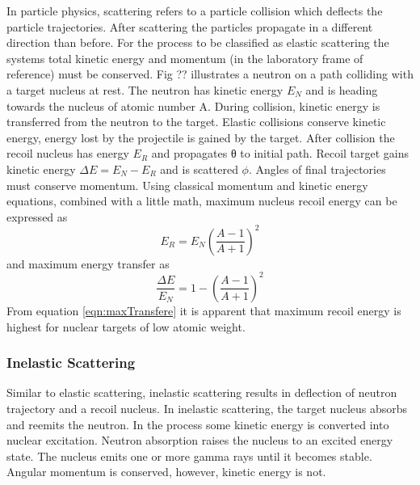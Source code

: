 In particle physics, scattering refers to a particle collision which deflects the particle trajectories. After scattering the particles propagate in a different direction than before. For the process to be classified as elastic scattering the systems total kinetic energy and momentum (in the laboratory frame of reference) must be conserved.
Fig ?? illustrates a neutron on a path colliding with a target nucleus at rest. The neutron has kinetic energy $E_N$  and is heading towards the nucleus of atomic number A. During collision, kinetic energy is transferred from the neutron to the target. Elastic collisions conserve kinetic energy, energy lost by the projectile is gained by the target. After collision the recoil nucleus has energy $E_R$ and propagates θ to initial path. Recoil target gains kinetic energy $\Delta E = E_N-E_R$ and is scattered $\phi$. Angles of final trajectories must conserve momentum.
Using classical momentum and kinetic energy equations, combined with a little math, maximum nucleus recoil energy can be expressed as
      \begin{equation}
      \label{eqn:maxRecoil}
      E_R=E_N \left (\frac{A-1}{A+1}  \right )^2
      \end{equation}
and maximum energy transfer as
      \begin{equation}
      \label{eqn:maxTransfere}
      \frac{\Delta E}{E_N} =1- \left (\frac{A-1}{A+1}  \right )^2
      \end{equation}
From equation \ref{eqn:maxTransfere} it is apparent that maximum recoil energy is highest for nuclear targets of low atomic weight.


\subsubsection{Inelastic Scattering}
Similar to elastic scattering, inelastic scattering results in deflection of neutron trajectory and a recoil nucleus. In inelastic scattering, the target nucleus absorbs and reemits the neutron. In the process some kinetic energy is converted into nuclear excitation. Neutron absorption raises the nucleus to an excited energy state. The nucleus emits one or more gamma rays until it becomes stable. Angular momentum is conserved, however, kinetic energy is not.


